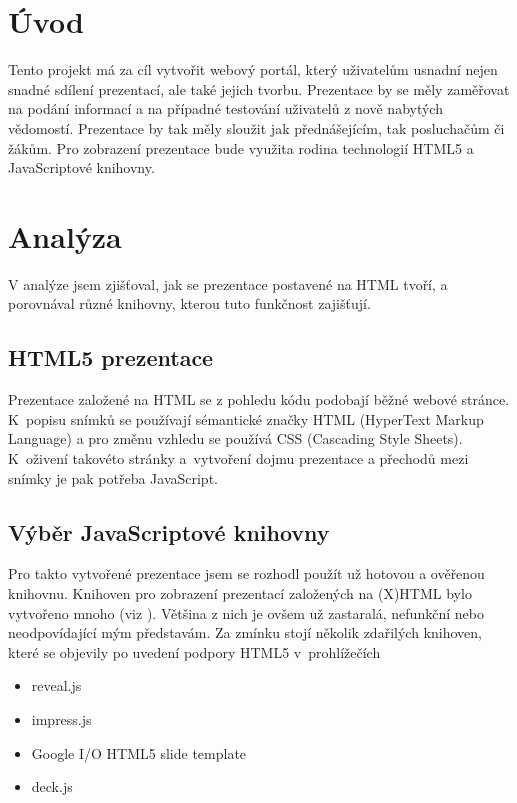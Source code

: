 \documentclass[11pt,twoside,a4paper]{book}
\begin{document}
	\listoffigures			%
	\listoftables			%

	\mainbodystarts



\chapter{Úvod}
Tento projekt má za cíl vytvořit webový portál, který uživatelům usnadní nejen snadné sdílení prezentací, ale také jejich tvorbu. Prezentace by se měly zaměřovat na podání informací a na případné testování uživatelů z nově nabytých vědomostí. Prezentace by tak měly sloužit jak přednášejícím, tak posluchačům či žákům. Pro zobrazení prezentace bude využita rodina technologií HTML5 a JavaScriptové knihovny.



\chapter{Analýza}
V analýze jsem zjišťoval, jak se prezentace postavené na HTML tvoří, a porovnával různé knihovny, kterou tuto funkčnost zajišťují.


\section{HTML5 prezentace}
Prezentace založené na HTML se z pohledu kódu podobají běžné webové stránce. K~popisu snímků se používají sémantické značky HTML (HyperText Markup Language) a pro změnu vzhledu se používá CSS (Cascading Style Sheets). K~oživení takovéto stránky a~vytvoření dojmu prezentace a přechodů mezi snímky je pak potřeba JavaScript.


\section{Výběr JavaScriptové knihovny}
Pro takto vytvořené prezentace jsem se rozhodl použít už hotovou a ověřenou knihovnu. Knihoven pro zobrazení prezentací založených na (X)HTML bylo vytvořeno mnoho (viz \cite{htmlslideshowweb}). Většina z nich je ovšem už zastaralá, nefunkční nebo neodpovídající mým představám. Za zmínku stojí několik zdařilých knihoven, které se objevily po uvedení podpory HTML5 v~prohlížečích

\begin{itemize}
\item reveal.js
\item impress.js
\item Google I/O HTML5 slide template
\item deck.js
\end{itemize}
\end{document}
